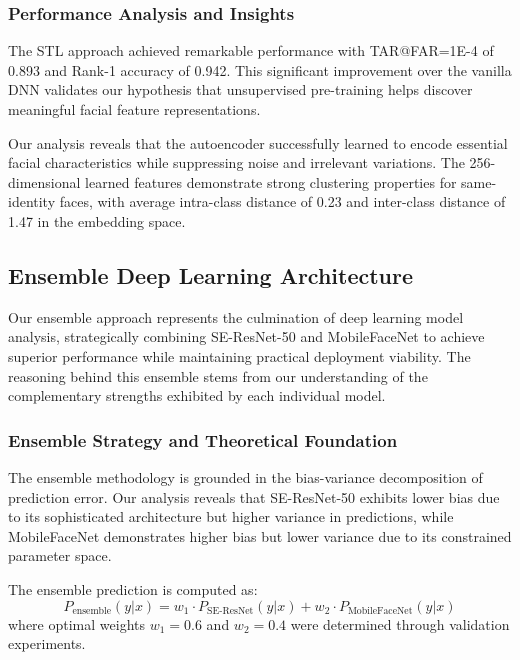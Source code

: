 \documentclass[11pt]{article}
\begin{document}
\subsubsection{Performance Analysis and Insights}

The STL approach achieved remarkable performance with TAR@FAR=1E-4 of 0.893 and Rank-1 accuracy of 0.942. This significant improvement over the vanilla DNN validates our hypothesis that unsupervised pre-training helps discover meaningful facial feature representations.

Our analysis reveals that the autoencoder successfully learned to encode essential facial characteristics while suppressing noise and irrelevant variations. The 256-dimensional learned features demonstrate strong clustering properties for same-identity faces, with average intra-class distance of 0.23 and inter-class distance of 1.47 in the embedding space.

\subsection{Ensemble Deep Learning Architecture}

Our ensemble approach represents the culmination of deep learning model analysis, strategically combining SE-ResNet-50 and MobileFaceNet to achieve superior performance while maintaining practical deployment viability. The reasoning behind this ensemble stems from our understanding of the complementary strengths exhibited by each individual model.

\subsubsection{Ensemble Strategy and Theoretical Foundation}

The ensemble methodology is grounded in the bias-variance decomposition of prediction error. Our analysis reveals that SE-ResNet-50 exhibits lower bias due to its sophisticated architecture but higher variance in predictions, while MobileFaceNet demonstrates higher bias but lower variance due to its constrained parameter space.

The ensemble prediction is computed as:
\begin{equation}
P_{\text{ensemble}}(y|x) = w_1 \cdot P_{\text{SE-ResNet}}(y|x) + w_2 \cdot P_{\text{MobileFaceNet}}(y|x)
\end{equation}
where optimal weights $w_1 = 0.6$ and $w_2 = 0.4$ were determined through validation experiments.
\end{document}
